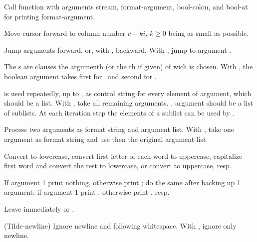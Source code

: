 \begin{LIST}{1cm}
\begin{LIST}{.5cm}
    Call function  with arguments stream, format-argument,
    bool-colon, and bool-at for printing format-argument.

    Move cursor forward to column number $c + ki$, $k \geq 0$ being as small
    as possible.

    Jump  arguments forward, or, with \kwd{:}, backward. With
    , jump to argument .

    The s are clauses the argumenth (or the th if given) of wich is chosen. With
    \kwd{:}, the boolean argument takes first  for \NIL\ and
    second for \T.

     is used repeatedly, up to , as control string for every element
    of argument, which should be a list. With , take all
    remaining arguments.
    \kwd{:}, argument should be a list of sublists. At each iteration
    step the elements of a sublist can be used by .

    Process two arguments as format string and argument list. With
    , take one argument as format string and use then the
    original argument list

    Convert to lowercase, convert first letter of each word to
    uppercase, capitalize first word and convert
    the rest to lowercase, or convert to uppercase, resp.

    If argument  1 print nothing, otherwise print ;
    do the same after backing up 1 argument; if argument  1
    print , otherwise print , resp.

    \IT{\KWD{\TLD\^{}}}
    Leave immediately \kwd{\TLD\boldmath{$<$}} or \kwd{\TLD\boldmath{$\{$}}.

    (Tilde-newline) Ignore newline and following
    whitespace. With , ignore only newline.

  \end{LIST}

\end{LIST}


